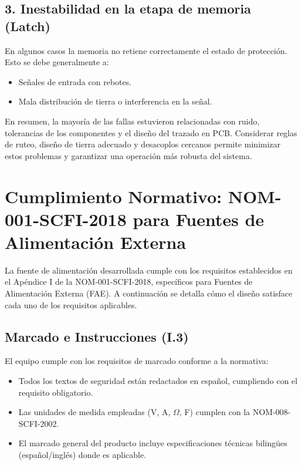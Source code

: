 \documentclass[pdflatex,sn-mathphys-num]{sn-jnl}%
\begin{document}
\subsection*{3. Inestabilidad en la etapa de memoria (Latch)}
En algunos casos la memoria no retiene correctamente el estado de protección. Esto se debe generalmente a:
\begin{itemize}
    \item Señales de entrada con rebotes.
    
    \item Mala distribución de tierra o interferencia en la señal.
\end{itemize}


En resumen, la mayoría de las fallas estuvieron relacionadas con ruido, tolerancias de los componentes y el diseño del trazado en PCB. Considerar reglas de ruteo, diseño de tierra adecuado y desacoplos cercanos permite minimizar estos problemas y garantizar una operación más robusta del sistema.


\section{Cumplimiento Normativo: NOM-001-SCFI-2018 para Fuentes de Alimentación Externa}
\label{sec:normatividad}

La fuente de alimentación desarrollada cumple con los requisitos establecidos en el Apéndice I de la NOM-001-SCFI-2018, específicos para Fuentes de Alimentación Externa (FAE). A continuación se detalla cómo el diseño satisface cada uno de los requisitos aplicables.

\subsection{Marcado e Instrucciones (I.3)}

El equipo cumple con los requisitos de marcado conforme a la normativa:
\begin{itemize}
    \item Todos los textos de seguridad están redactados en español, cumpliendo con el requisito obligatorio.
    \item Las unidades de medida empleadas (V, A, $\Omega$, F) cumplen con la NOM-008-SCFI-2002.
    \item El marcado general del producto incluye especificaciones técnicas bilingües (español/inglés) donde es aplicable.
\end{itemize}
\end{document}
